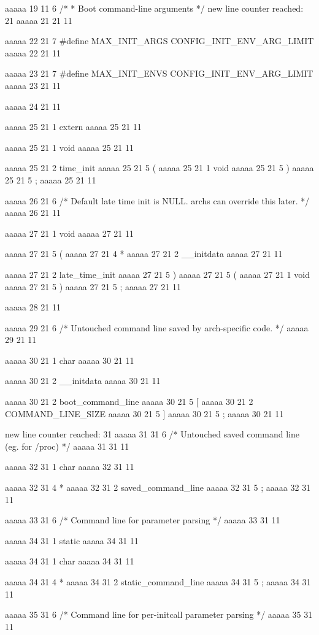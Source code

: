 aaaaa 19 11
6
/*
 * Boot command-line arguments
 */
new line counter reached: 21
aaaaa 21 21
11


aaaaa 22 21
7
#define MAX_INIT_ARGS CONFIG_INIT_ENV_ARG_LIMIT
aaaaa 22 21
11


aaaaa 23 21
7
#define MAX_INIT_ENVS CONFIG_INIT_ENV_ARG_LIMIT
aaaaa 23 21
11


aaaaa 24 21
11


aaaaa 25 21
1
extern
aaaaa 25 21
11
 
aaaaa 25 21
1
void
aaaaa 25 21
11
 
aaaaa 25 21
2
time_init
aaaaa 25 21
5
(
aaaaa 25 21
1
void
aaaaa 25 21
5
)
aaaaa 25 21
5
;
aaaaa 25 21
11


aaaaa 26 21
6
/* Default late time init is NULL. archs can override this later. */
aaaaa 26 21
11


aaaaa 27 21
1
void
aaaaa 27 21
11
 
aaaaa 27 21
5
(
aaaaa 27 21
4
*
aaaaa 27 21
2
__initdata
aaaaa 27 21
11
 
aaaaa 27 21
2
late_time_init
aaaaa 27 21
5
)
aaaaa 27 21
5
(
aaaaa 27 21
1
void
aaaaa 27 21
5
)
aaaaa 27 21
5
;
aaaaa 27 21
11


aaaaa 28 21
11


aaaaa 29 21
6
/* Untouched command line saved by arch-specific code. */
aaaaa 29 21
11


aaaaa 30 21
1
char
aaaaa 30 21
11
 
aaaaa 30 21
2
__initdata
aaaaa 30 21
11
 
aaaaa 30 21
2
boot_command_line
aaaaa 30 21
5
[
aaaaa 30 21
2
COMMAND_LINE_SIZE
aaaaa 30 21
5
]
aaaaa 30 21
5
;
aaaaa 30 21
11


new line counter reached: 31
aaaaa 31 31
6
/* Untouched saved command line (eg. for /proc) */
aaaaa 31 31
11


aaaaa 32 31
1
char
aaaaa 32 31
11
 
aaaaa 32 31
4
*
aaaaa 32 31
2
saved_command_line
aaaaa 32 31
5
;
aaaaa 32 31
11


aaaaa 33 31
6
/* Command line for parameter parsing */
aaaaa 33 31
11


aaaaa 34 31
1
static
aaaaa 34 31
11
 
aaaaa 34 31
1
char
aaaaa 34 31
11
 
aaaaa 34 31
4
*
aaaaa 34 31
2
static_command_line
aaaaa 34 31
5
;
aaaaa 34 31
11


aaaaa 35 31
6
/* Command line for per-initcall parameter parsing */
aaaaa 35 31
11


